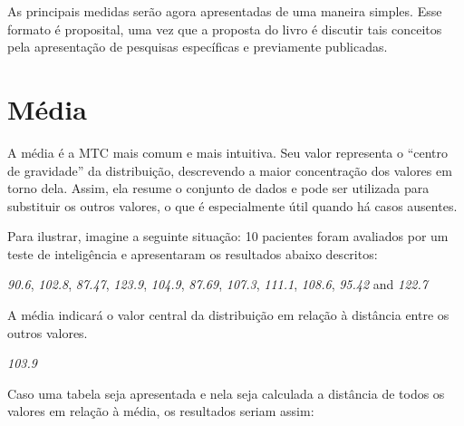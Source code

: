 \documentclass[
]{book}
\begin{document}
As principais medidas serão agora apresentadas de uma maneira simples. Esse formato é proposital, uma vez que a proposta do livro é discutir tais conceitos pela apresentação de pesquisas específicas e previamente publicadas.

\hypertarget{muxe9dia}{%
\section{Média}\label{muxe9dia}}

A média é a MTC mais comum e mais intuitiva. Seu valor representa o ``centro de gravidade'' da distribuição, descrevendo a maior concentração dos valores em torno dela. Assim, ela resume o conjunto de dados e pode ser utilizada para substituir os outros valores, o que é especialmente útil quando há casos ausentes.

Para ilustrar, imagine a seguinte situação: 10 pacientes foram avaliados por um teste de inteligência e apresentaram os resultados abaixo descritos:

\emph{90.6}, \emph{102.8}, \emph{87.47}, \emph{123.9}, \emph{104.9}, \emph{87.69}, \emph{107.3}, \emph{111.1}, \emph{108.6}, \emph{95.42} and \emph{122.7}

A média indicará o valor central da distribuição em relação à distância entre os outros valores.

\emph{103.9}

Caso uma tabela seja apresentada e nela seja calculada a distância de todos os valores em relação à média, os resultados seriam assim:
\end{document}
